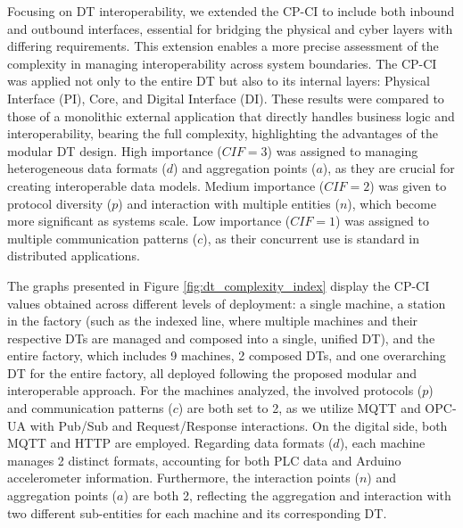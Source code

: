 
Focusing on \ac{DT} interoperability, we extended the CP-CI to include both inbound and outbound interfaces, essential for bridging the physical and cyber layers with differing requirements.
This extension enables a more precise assessment of the complexity in managing interoperability across system boundaries.
The CP-CI was applied not only to the entire \ac{DT} but also to its internal layers: Physical Interface (PI), Core, and Digital Interface (DI).
These results were compared to those of a monolithic external application that directly handles business logic and interoperability, bearing the full complexity, highlighting the advantages of the modular \ac{DT} design.
High importance ($CIF=3$) was assigned to managing heterogeneous data formats ($d$) and aggregation points ($a$), as they are crucial for creating interoperable data models.
Medium importance ($CIF=2$) was given to protocol diversity ($p$) and interaction with multiple entities ($n$), which become more significant as systems scale.
Low importance ($CIF=1$) was assigned to multiple communication patterns ($c$), as their concurrent use is standard in distributed applications.

The graphs presented in Figure \ref{fig:dt_complexity_index} display the CP-CI values obtained across different levels of deployment: a single machine, a station in the factory (such as the indexed line, where multiple machines and their respective DTs are managed and composed into a single, unified DT), and the entire factory, which includes 9 machines, 2 composed DTs, and one overarching DT for the entire factory, all deployed following the proposed modular and interoperable approach.
For the machines analyzed, the involved protocols ($p$) and communication patterns ($c$) are both set to 2, as we utilize MQTT and OPC-UA with Pub/Sub and Request/Response interactions.
On the digital side, both MQTT and HTTP are employed.
Regarding data formats ($d$), each machine manages 2 distinct formats, accounting for both PLC data and Arduino accelerometer information.
Furthermore, the interaction points ($n$) and aggregation points ($a$) are both 2, reflecting the aggregation and interaction with two different sub-entities for each machine and its corresponding DT.

